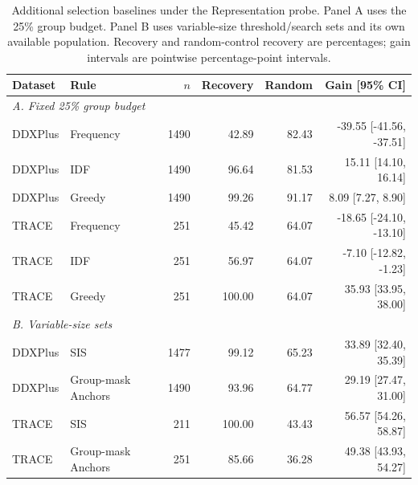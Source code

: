 \begin{table}[!htbp]
\centering\small
\caption{Additional selection baselines under the Representation probe. Panel A uses the 25\% group budget. Panel B uses variable-size threshold/search sets and its own available population. Recovery and random-control recovery are percentages; gain intervals are pointwise percentage-point intervals.}\label{tab:extra-selection}
\begin{tabular}{llrrrr}\toprule
Dataset & Rule & $n$ & Recovery & Random & Gain [95\% CI]\\\midrule
\multicolumn{6}{l}{\textit{A. Fixed 25\% group budget}}\\
DDXPlus & Frequency & 1490 & 42.89 & 82.43 & -39.55 [-41.56, -37.51] \\
DDXPlus & IDF & 1490 & 96.64 & 81.53 & 15.11 [14.10, 16.14] \\
DDXPlus & Greedy & 1490 & 99.26 & 91.17 & 8.09 [7.27, 8.90] \\
TRACE & Frequency & 251 & 45.42 & 64.07 & -18.65 [-24.10, -13.10] \\
TRACE & IDF & 251 & 56.97 & 64.07 & -7.10 [-12.82, -1.23] \\
TRACE & Greedy & 251 & 100.00 & 64.07 & 35.93 [33.95, 38.00] \\
\midrule\multicolumn{6}{l}{\textit{B. Variable-size sets}}\\
DDXPlus & SIS & 1477 & 99.12 & 65.23 & 33.89 [32.40, 35.39] \\
DDXPlus & Group-mask Anchors & 1490 & 93.96 & 64.77 & 29.19 [27.47, 31.00] \\
TRACE & SIS & 211 & 100.00 & 43.43 & 56.57 [54.26, 58.87] \\
TRACE & Group-mask Anchors & 251 & 85.66 & 36.28 & 49.38 [43.93, 54.27] \\
\bottomrule\end{tabular}
\end{table}
